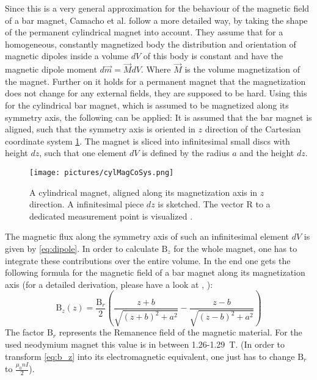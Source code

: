 Since this is a very general approximation for the behaviour of the magnetic field of a bar magnet, Camacho et al. \cite{camacho2013alternative} follow a more detailed way, by taking the shape of the permanent cylindrical magnet into account. They assume that for a homogeneous, constantly magnetized body the distribution and orientation of magnetic dipoles inside a volume $ dV $ of this body is constant and have the magnetic dipole moment $ d\vec{m} = \vec{M}dV $. Where $ \vec{M} $ is the volume magnetization of the magnet. Further on it holds for a permanent magnet that the magnetization does not change for any external fields, they are supposed to be hard. Using this for the cylindrical bar magnet, which is assumed to be magnetized along its symmetry axis, the following can be applied: It is assumed that the bar magnet is aligned, such that the symmetry axis is oriented in $ z $ direction of the Cartesian coordinate system \ref{fig:cylMag}. The magnet is sliced into infinitesimal small discs with height $ dz $, such that one element $ dV $ is defined by the radius $ a $ and the height $ dz $. 
\begin{figure}
\centering
\texttt{[image: pictures/cylMagCoSys.png]}
\caption{A cylindrical magnet, aligned along its magnetization axis in $ z $ direction. A infinitesimal piece $ dz $ is sketched. The vector R to a dedicated measurement point is visualized \cite{derby2010cylindrical}.}
\label{fig:cylMag}
\end{figure}
The magnetic flux along the symmetry axis of such an infinitesimal element $ dV $ is given by \ref{eq:dipole}. In order to calculate $ \mathrm{B}_{z} $ for the whole magnet, one has to integrate these contributions over the entire volume. In the end one gets the following formula for the magnetic field of a bar magnet along its magnetization axis (for a detailed derivation, please have a look at \cite{camacho2013alternative}, \cite{derby2010cylindrical}):
\begin{equation} \label{eq:b_z}
\mathrm{B}_{z}(z) = \frac{\mathrm{B}_r}{2} \left ( \frac{z + b}{\sqrt{(z + b)^2 + a^2}} - \frac{z - b}{\sqrt{(z - b)^2 + a^2}} \right)
\end{equation}
The factor $ \mathrm{B}_r $ represents the Remanence field of the magnetic material. For the used neodymium magnet this value is in between 1.26-\SI{1.29}{\tesla}. (In order to transform \ref{eq:b_z} into its electromagnetic equivalent, one just has to change $ \mathrm{B}_r $ to $ \frac{\mu_{0} n I}{2} $).\\
